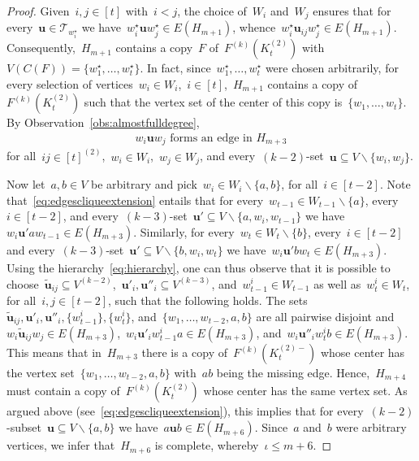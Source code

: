 \documentclass[oneside, 12pt]{amsart}
\numberwithin{equation}{section}
\numberwithin{figure}{section}
\let\setminus=\smallsetminus
\newcommand{\cT}{\mathcal{T}}
\theoremstyle{plain}
\theoremstyle{note}
\theoremstyle{remark}
\begin{document}
\begin{proof}
		Given~$i,j\in[t]$ with~$i<j$, the choice of~$W_i$ and~$W_j$ ensures that for every~$\mathbf{u} \in \cT_{w_i^\star}$ we have~$w_i^\star \mathbf{u} w_j^\star \in E(H_{m+1})$, whence~$w_i^\star \mathbf{u}_{ij} w_j^\star \in E(H_{m+1})$.
		Consequently,~$H_{m+1}$ contains a copy~$F$ of~$F^{(k)}(K_t^{(2)})$ with~$V(C(F))=\{w_1^\star, \ldots, w_t^\star\}$.
		In fact, since~$w_1^\star,\dots,w_t^\star$ were chosen arbitrarily, for every selection of vertices~$w_i\in W_i$,~$i\in[t]$,~$H_{m+1}$ contains a copy of~$F^{(k)}(K_t^{(2)})$ such that the vertex set of the center of this copy is~$\{w_1, \ldots, w_t\}$.
		By Observation~\ref{obs:almostfulldegree},
		\begin{align}\label{eq:edgescliqueextension}
			\text{$w_i\mathbf{u}w_j$ forms an edge in~$H_{m+3}$}
		\end{align}
		for all~$ij\in[t]^{(2)}$,~$w_i\in W_i$,~$w_j\in W_j$, and every~$(k-2)$-set~$\mathbf{u} \subseteq V \setminus \{w_i,w_j\}$.
		
        Now let~$a,b\in V$ be arbitrary and pick~$w_i\in W_i\setminus\{a,b\}$, for all~$i\in[t-2]$.
		Note that~\eqref{eq:edgescliqueextension} entails that for every~$w_{t-1}\in W_{t-1}\setminus\{a\}$, every~$i\in[t-2]$, and every~$(k-3)$-set~$\mathbf{u'}\subseteq V\setminus\{a,w_i,w_{t-1}\}$ we have~$w_i\mathbf{u'}aw_{t-1}\in E(H_{m+3})$.
		Similarly, for every~$w_t\in W_t\setminus\{b\}$, every~$i\in[t-2]$ and every~$(k-3)$-set~$\mathbf{u'}\subseteq V\setminus\{b,w_i,w_t\}$ we have~$w_i\mathbf{u'}bw_t\in E(H_{m+3})$.
		Using the hierarchy~\eqref{eq:hierarchy}, one can thus observe that it is possible to choose~$\widetilde{\mathbf{u}}_{ij}\subseteq V^{(k-2)}$,~$\mathbf{u}'_i,\mathbf{u}''_i\subseteq V^{(k-3)}$, and~$w_{t-1}^i\in W_{t-1}$ as well as~$w_t^i\in W_t$, for all~$i,j\in[t-2]$, such that the following holds.
        The sets~$\widetilde{\mathbf{u}}_{ij},\mathbf{u}'_i,\mathbf{u}''_i,\{w_{t-1}^i\},\{w_t^i\}$, and~$\{w_1,\dots,w_{t-2},a,b\}$ are all pairwise disjoint and~$w_i\widetilde{\mathbf{u}}_{ij}w_j\in E(H_{m+3})$,~$w_i\mathbf{u}'_iw_{t-1}^ia\in E(H_{m+3})$, and~$w_i\mathbf{u}''_iw_t^ib\in E(H_{m+3})$.
        This means that in~$H_{m+3}$ there is a copy of~$F^{(k)}(K_t^{(2)-})$ whose center has the vertex set~$\{w_1,\dots,w_{t-2},a,b\}$ with~$ab$ being the missing edge.
		Hence,~$H_{m+4}$ must contain a copy of~$F^{(k)}(K_t^{(2)})$ whose center has the same vertex set.
		As argued above (see~\eqref{eq:edgescliqueextension}), this implies that for every~$(k-2)$-subset~$\mathbf{u}\subseteq V\setminus\{a,b\}$ we have~$a\mathbf{u}b\in E(H_{m+6})$.
		Since~$a$ and~$b$ were arbitrary vertices, we infer that~$H_{m+6}$ is complete, whereby~$\iota\leq m+6$.
	\end{proof}
\end{document}
